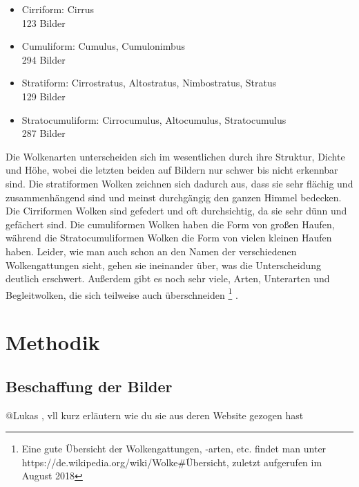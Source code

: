 \documentclass[a4,german]{article}
\begin{document}
\begin{itemize}
\item Cirriform: Cirrus\\123 Bilder
\item Cumuliform: Cumulus, Cumulonimbus\\294 Bilder
\item Stratiform: Cirrostratus, Altostratus, Nimbostratus, Stratus\\129 Bilder
\item Stratocumuliform: Cirrocumulus, Altocumulus, Stratocumulus\\287 Bilder
\end{itemize}

Die Wolkenarten unterscheiden sich im wesentlichen durch ihre Struktur, Dichte und Höhe, wobei die letzten beiden auf Bildern nur schwer bis nicht erkennbar sind. Die stratiformen Wolken zeichnen sich dadurch aus, dass sie sehr flächig und zusammenhängend sind und meinst durchgängig den ganzen Himmel bedecken. Die Cirriformen Wolken sind gefedert und oft durchsichtig, da sie sehr dünn und gefächert sind. Die cumuliformen Wolken haben die Form von großen Haufen, während die Stratocumuliformen Wolken die Form von vielen kleinen Haufen haben. Leider, wie man auch schon an den Namen der verschiedenen Wolkengattungen sieht, gehen sie ineinander über, was die Unterscheidung deutlich erschwert. Außerdem gibt es noch sehr viele, Arten, Unterarten und Begleitwolken, die sich teilweise auch überschneiden \footnote{Eine gute Übersicht der Wolkengattungen, -arten, etc. findet man unter\\ https://de.wikipedia.org/wiki/Wolke\#Übersicht, zuletzt aufgerufen im August 2018} . 

\section{Methodik}


\subsection{Beschaffung der Bilder}
@Lukas , vll  kurz erläutern wie du sie aus deren Website gezogen hast
\end{document}
